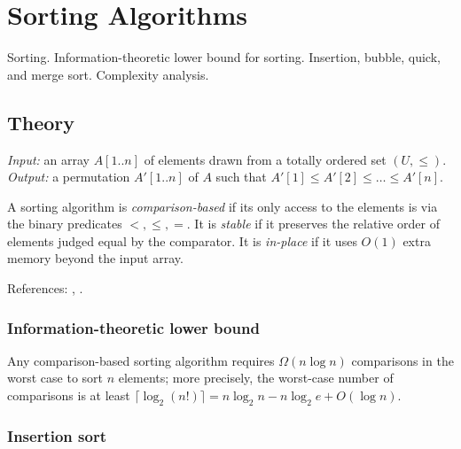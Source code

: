 
\section{Sorting Algorithms}
\label{sec:1.3.03-sorting}

\begin{ticket}
Sorting. Information-theoretic lower bound for sorting. Insertion, bubble, quick, and merge sort. Complexity analysis.
\end{ticket}

\subsection*{Theory}

\begin{definition}
\label{def:sorting}
\emph{Input:} an array $A[1..n]$ of elements drawn from a totally
ordered set $(U, \leq)$.\\
\emph{Output:} a permutation $A'[1..n]$ of $A$ such that
$A'[1] \leq A'[2] \leq \dots \leq A'[n]$.
\end{definition}

A sorting algorithm is \emph{comparison-based} if its only access to
the elements is via the binary predicates $<, \leq, =$. It is
\emph{stable} if it preserves the relative order of elements judged
equal by the comparator. It is \emph{in-place} if it uses
$O(1)$ extra memory beyond the input array.

References: \cite[Chs.~2, 7, 8]{CLRS2013}, \cite{Skiena2014}.

\subsubsection*{Information-theoretic lower bound}

\begin{theorem}
\label{thm:comparison-lb}
Any comparison-based sorting algorithm requires
$\Omega(n \log n)$ comparisons in the worst case to sort $n$
elements; more precisely, the worst-case number of comparisons is at
least $\lceil \log_2 (n!) \rceil = n \log_2 n - n \log_2 e + O(\log n)$.
\end{theorem}

\subsubsection*{Insertion sort}

